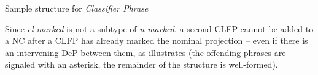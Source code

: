 \documentclass[output=paper,colorlinks,citecolor=brown]{langscibook}
\begin{document}
\ea Sample structure for \textit{Classifier Phrase}
        \label{num-cl:deng}
\z





\noindent Since \textit{cl-marked}  is not a subtype of \textit{n-marked}, a second CLFP cannot be added to a NC after a CLFP has already marked the nominal projection -- even if there is an intervening DeP between them, as  illustrates (the offending phrases are signaled with an asterisk, the remainder of the structure is well-formed).
\end{document}
